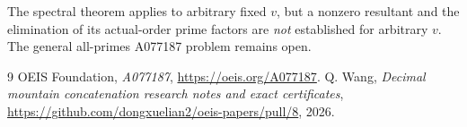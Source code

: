 \documentclass[10pt]{article}
\begin{document}
The spectral theorem applies to arbitrary fixed \(v\), but a
nonzero resultant and the elimination of its actual-order
prime factors are \emph{not} established for arbitrary \(v\).
The general all-primes A077187 problem remains open.

\begin{thebibliography}{9}
 OEIS Foundation,
\emph{A077187}, \url{https://oeis.org/A077187}.
 Q. Wang,
\emph{Decimal mountain concatenation research notes and exact certificates},
\url{https://github.com/dongxuelian2/oeis-papers/pull/8}, 2026.
\end{thebibliography}
\end{document}
